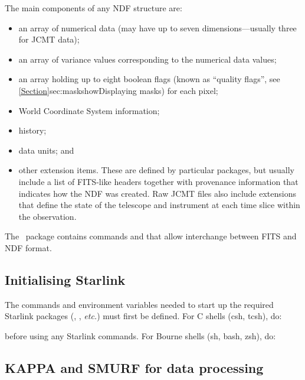 The main components of any NDF structure are:
\begin{itemize}
\item an array of numerical data (may have up to seven
dimensions---usually three for JCMT data);
\item an array of variance values corresponding to the numerical data
values;
\item an array holding up to eight boolean flags (known as ``quality
flags'', see \cref{Section}{sec:maskshow}{Displaying masks}) for each pixel;
\item World Coordinate System information;
\item history;
\item data units; and
\item other extension items. These are defined by particular packages,
but usually include a list of FITS-like headers together with provenance
information that indicates how the NDF was created. Raw JCMT files also
include extensions that define the state of the telescope and instrument
at each time slice within the observation.
\end{itemize}

The \convert\ package contains commands  and
 that allow interchange between FITS
and NDF format.

\subsection{Initialising Starlink}
\label{sec:starinit}

The commands and environment variables needed to start up the required
Starlink packages (\smurf \cite{smurf}, \Kappa, \emph{etc.}) must first
be defined. For C shells (csh, tcsh), do:

\begin{terminalv}
\end{terminalv}

before using any Starlink commands. For Bourne shells (sh, bash, zsh), do:

\begin{terminalv}
\end{terminalv}

\subsection{KAPPA and SMURF for data processing}
\label{sec:packinit}

